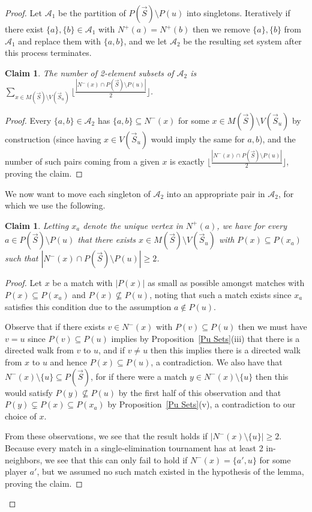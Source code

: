 \documentclass[12pt,letterpaper]{article}
\newtheorem{claim}[thm]{Claim}
\theoremstyle{definition}
\renewcommand{\1}{\mathbbm{1}}
\newcommand{\sm}{\setminus}
\newcommand{\sub}{\subseteq}
\renewcommand{\c}[1]{\mathcal{#1}}
\newcommand{\tour}{\vec{S}}
\begin{document}
\begin{proof}
	Let $\c{A}_1$ be the partition of $P(\tour)\sm P(u)$ into singletons. Iteratively if there exist $\{a\},\{b\}\in \c{A}_1$ with $N^+(a)=N^+(b)$ then we remove $\{a\},\{b\}$ from $\c{A}_1$ and replace them with $\{a,b\}$, and we let $\c{A}_2$ be the resulting set system after this process terminates. 
	
	\begin{claim}\label{Claim A size}
		The number of 2-element subsets of $\c{A}_2$ is $\sum_{x\in M(\tour)\sm V(\tour_u)} \lfloor \frac{|N^-(x)\cap P(\tour)\sm P(u)|}{2} \rfloor$.
	\end{claim}
	\begin{proof}
		Every $\{a,b\}\in \c{A}_2$ has $\{a,b\}\sub N^-(x)$ for some $x\in M(\tour)\sm V(\tour_u)$ by construction (since having $x\in V(\tour_u)$ would imply the same for $a,b$), and the number of such pairs coming from a given $x$ is exactly $ \lfloor \frac{|N^-(x)\cap P(\tour)\sm P(u)|}{2} \rfloor$, proving the claim.
	\end{proof}
	We now want to move each singleton of $\c{A}_2$ into an appropriate pair in $\c{A}_2$, for which we use the following.
	\begin{claim}
		Letting $x_a$ denote the unique vertex in $N^+(a)$, we have for every $a\in P(\tour)\sm P(u)$ that there exists $x\in M(\tour)\sm V(\tour_u)$ with $P(x)\sub P(x_a)$ such that $|N^-(x)\cap P(\tour)\sm P(u)|\ge 2$.
	\end{claim}
	\begin{proof}
		Let $x$ be a match with $|P(x)|$ as small as possible amongst matches with $P(x)\sub P(x_a)$ and $P(x)\not \sub P(u)$, noting that such a match exists since $x_a$ satisfies this condition due to the assumption $a\notin P(u)$.
		
		Observe that if there exists $v\in N^-(x)$ with $P(v)\sub P(u)$ then we must have $v=u$ since $P(v)\sub P(u)$ implies by Proposition~\ref{Pu Sets}(iii) that there is a directed walk from $v$ to $u$, and if $v\ne u$ then this implies there is a directed walk from $x$ to $u$ and hence $P(x)\sub P(u)$, a contradiction.  We also have that $N^-(x)\sm \{u\}\sub P(\tour)$, for if there were a match $y\in N^-(x)\sm \{u\}$ then this would satisfy $P(y)\not \sub P(u)$ by the first half of this observation and that $P(y)\subsetneq P(x)\sub P(x_a)$ by Proposition~\ref{Pu Sets}(v), a contradiction to our choice of $x$.
		
		From these observations, we see that the result holds if $|N^-(x)\sm \{u\}|\ge 2$.  Because  every match in a single-elimination tournament has at least 2 in-neighbors, we see that this can only fail to hold if $N^-(x)=\{a',u\}$ for some player $a'$, but we assumed no such match existed in the hypothesis of the lemma, proving the claim.
	\end{proof}
	

\end{proof}
\end{document}

